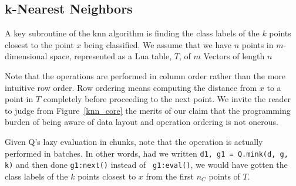 \subsection{k-Nearest Neighbors}
\label{knn}

A key subroutine of the knn algorithm \cite{Hastie2009} is finding the class labels of the
\(k\) points closest to the point \(x\) being classified. 
We assume that we have \(n\) points in \(m\)-dimensional space, represented as a
Lua table, \(T\), of \(m\) Vectors of length \(n\)

Note that the operations are performed in column
order rather than the more intuitive row order. Row ordering means computing the
distance from \(x\) to a point in \(T\) completely before proceeding to the next
point. We invite the reader to judge from Figure~\ref{knn_core} the merits of our claim that the programming burden of being aware of data layout and
operation ordering is not onerous.

Given Q's lazy evaluation in chunks, note that the operation is actually
performed in batches. In other words, had we written 
{\tt d1, g1 = Q.mink(d, g, k)} and then done {\tt g1:next()} instead  of {\tt
g1:eval()}, 
we would have gotten the class labels of the \(k\) points
closest to \(x\) from the first \(n_C\) points of \(T\). 


\begin{figure}[hbtp]
\centering
{}
\end{figure}


